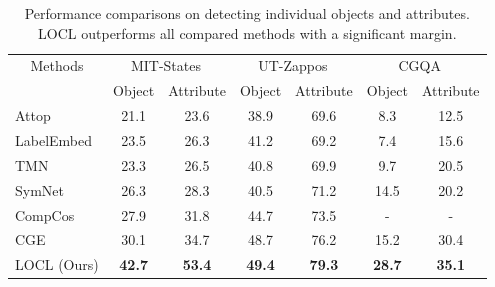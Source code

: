 \documentclass{bmvc2k}
\newcommand{\tablelightgray}{\rowcolor[gray]{.95}}
\begin{document}
\begin{table*}[h]
\centering
\begin{adjustbox}{width=0.8\textwidth}
\begin{tabular}{l|cc|cc|cc}
\multicolumn{1}{c|}{\multirow{2}{*}{Methods}}        & \multicolumn{2}{c|}{MIT-States~\cite{isola2015discovering}} & \multicolumn{2}{c|}{UT-Zappos~\cite{yu2017semantic}} & \multicolumn{2}{c}{CGQA~\cite{naeem2021learning}} \\
\multicolumn{1}{c|}{}                                & Object                       & Attribute                    & Object                    & Attribute                & Object                  & Attribute               \\ \hline
\tablelightgray Attop~\cite{nagarajan2018attributes} & 21.1                         & 23.6                         & 38.9                      & 69.6                     & 8.3                     & 12.5                    \\
LabelEmbed~\cite{misra2017red}                       & 23.5                         & 26.3                         & 41.2                      & 69.2                     & 7.4                     & 15.6                    \\
\tablelightgray TMN~\cite{purushwalkam2019task}      & 23.3                         & 26.5                         & 40.8                      & 69.9                     & 9.7                     & 20.5                    \\
SymNet~\cite{li2020symmetry}                         & 26.3                         & 28.3                         & 40.5                      & 71.2                     & 14.5                    & 20.2                    \\
\tablelightgray CompCos~\cite{mancini2021open}       & 27.9                         & 31.8                         & 44.7                      & 73.5                     & -                       & -                       \\
CGE~\cite{naeem2021learning}                         & 30.1                         & 34.7                         & 48.7                      & 76.2                     & 15.2                    & 30.4                    \\
\tablelightgray LOCL (Ours)                          & \textbf{42.7}                & \textbf{53.4}                & \textbf{49.4}             & \textbf{79.3}            & \textbf{28.7}           & \textbf{35.1}           \\ \hline
\end{tabular}

\end{adjustbox}
\vspace{0.1cm}
 \caption{Performance comparisons on detecting individual objects and attributes. LOCL outperforms all compared methods with a significant margin.}
\label{tab:main_result_obj_attr}
\vspace{-0.4cm}
\end{table*}
\end{document}
